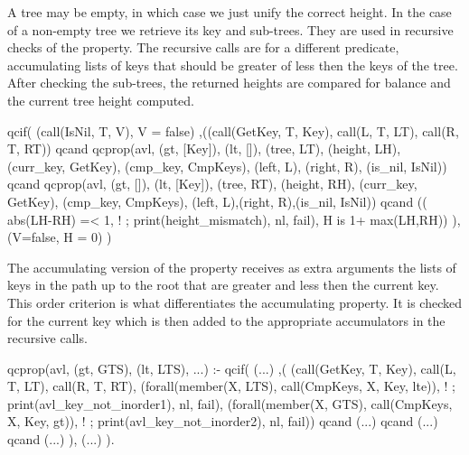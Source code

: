 A tree may be empty, in which case we just unify the correct height.
%
In the case of a non-empty tree we retrieve its key and sub-trees.
%
They are used in recursive checks of the property.
%
The recursive calls are for a different predicate, accumulating lists of
keys that should be greater of less then the keys of the tree.
%
After checking the sub-trees, the returned heights are compared for
balance and the current tree height computed.
%
\begin{yapcode}
   qcif( (call(IsNil, T, V), V = false)
   ,((call(GetKey, T, Key),
       call(L, T, LT),  call(R, T, RT))
   qcand
     qcprop({avl, (gt, [Key]), (lt, []),
 (tree, LT), (height, LH),
 (curr_key, GetKey), (cmp_key, CmpKeys),
 (left, L), (right, R), (is_nil, IsNil)})
   qcand
     qcprop({avl, (gt, []), (lt, [Key]),
 (tree, RT), (height, RH),
 (curr_key, GetKey), (cmp_key, CmpKeys),
 (left, L),(right, R),(is_nil, IsNil)})
   qcand
     (( abs(LH-RH) =< 1, !
     ; print(height_mismatch), nl, fail),
     H is 1+ max(LH,RH))
   ),
   (V=false, H = 0) )
\end{yapcode}
%


The accumulating version of the property receives as extra arguments the
lists of keys in the path up to the root that are greater and less then
the current key.
%
This order criterion is what differentiates the accumulating property.
%
It is checked for the current key which is then added to the appropriate
accumulators in the recursive calls.
\begin{yapcode}
 qcprop({avl, (gt, GTS), (lt, LTS), ...}) :-
   qcif(
     (...)
   ,(
     (call(GetKey, T, Key), call(L, T, LT),
      call(R, T, RT),
      (forall(member(X, LTS),
       call(CmpKeys, X, Key, lte)), !
      ; print(avl_key_not_inorder1), nl, fail),
      (forall(member(X, GTS),
       call(CmpKeys, X, Key, gt)), !
      ; print(avl_key_not_inorder2), nl, fail))
   qcand (...)
   qcand (...)
   qcand (...)
   ),
     (...)
   ).
\end{yapcode}


